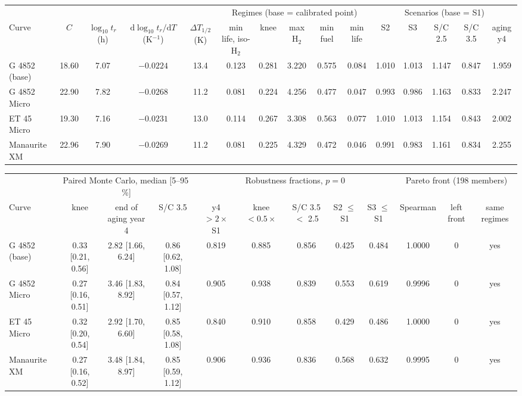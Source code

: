 \begin{tabular}{lcccc ccccc ccccc}
\toprule
 & & & & & \multicolumn{5}{c}{Regimes (base = calibrated point)} & \multicolumn{5}{c}{Scenarios (base = S1)} \\
\cmidrule(lr){6-10}\cmidrule(lr){11-15}
Curve & $C$ & $\log_{10} t_r$ (h) & $\mathrm{d}\log_{10} t_r/\mathrm{d}T$ (K$^{-1}$) & $\Delta T_{1/2}$ (K) & min life, iso-H$_2$ & knee & max H$_2$ & min fuel & min life & S2 & S3 & S/C 2.5 & S/C 3.5 & aging y4 \\
\midrule
G 4852 (base) & 18.60 & 7.07 & $-0.0224$ & 13.4 & 0.123 & 0.281 & 3.220 & 0.575 & 0.084 & 1.010 & 1.013 & 1.147 & 0.847 & 1.959 \\
G 4852 Micro & 22.90 & 7.82 & $-0.0268$ & 11.2 & 0.081 & 0.224 & 4.256 & 0.477 & 0.047 & 0.993 & 0.986 & 1.163 & 0.833 & 2.247 \\
ET 45 Micro & 19.30 & 7.16 & $-0.0231$ & 13.0 & 0.114 & 0.267 & 3.308 & 0.563 & 0.077 & 1.010 & 1.013 & 1.154 & 0.843 & 2.002 \\
Manaurite XM & 22.96 & 7.90 & $-0.0269$ & 11.2 & 0.081 & 0.225 & 4.329 & 0.472 & 0.046 & 0.991 & 0.983 & 1.161 & 0.834 & 2.255 \\
\bottomrule
\end{tabular}

\medskip

\begin{tabular}{l ccc ccccc ccc}
\toprule
 & \multicolumn{3}{c}{Paired Monte Carlo, median [5--95\,\%]} & \multicolumn{5}{c}{Robustness fractions, $p = 0$} & \multicolumn{3}{c}{Pareto front (198 members)} \\
\cmidrule(lr){2-4}\cmidrule(lr){5-9}\cmidrule(lr){10-12}
Curve & knee & end of aging year 4 & S/C 3.5 & y4 $> 2\times$ S1 & knee $< 0.5\times$ & S/C 3.5 $<$ 2.5 & S2 $\le$ S1 & S3 $\le$ S1 & Spearman & left front & same regimes \\
\midrule
G 4852 (base) & 0.33 [0.21, 0.56] & 2.82 [1.66, 6.24] & 0.86 [0.62, 1.08] & 0.819 & 0.885 & 0.856 & 0.425 & 0.484 & 1.0000 & 0 & yes \\
G 4852 Micro & 0.27 [0.16, 0.51] & 3.46 [1.83, 8.92] & 0.84 [0.57, 1.12] & 0.905 & 0.938 & 0.839 & 0.553 & 0.619 & 0.9996 & 0 & yes \\
ET 45 Micro & 0.32 [0.20, 0.54] & 2.92 [1.70, 6.60] & 0.85 [0.58, 1.08] & 0.840 & 0.910 & 0.858 & 0.429 & 0.486 & 1.0000 & 0 & yes \\
Manaurite XM & 0.27 [0.16, 0.52] & 3.48 [1.84, 8.97] & 0.85 [0.59, 1.12] & 0.906 & 0.936 & 0.836 & 0.568 & 0.632 & 0.9995 & 0 & yes \\
\bottomrule
\end{tabular}
